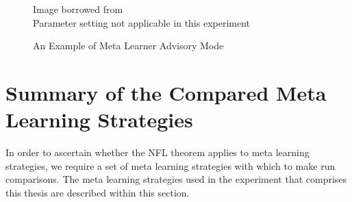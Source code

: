 \begin{figure}[h]
\caption{An Example of Meta Learner Advisory Mode}
\centering
Image borrowed from \cite{Vilalta} \\
Parameter setting not applicable in this experiment
\end{figure}

\section{Summary of the Compared Meta Learning Strategies}
In order to ascertain whether the NFL theorem applies to meta learning strategies,
we require a set of meta learning strategies with which to make run comparisons. The
meta learning strategies used in the experiment that comprises this thesis are described within
this section.
